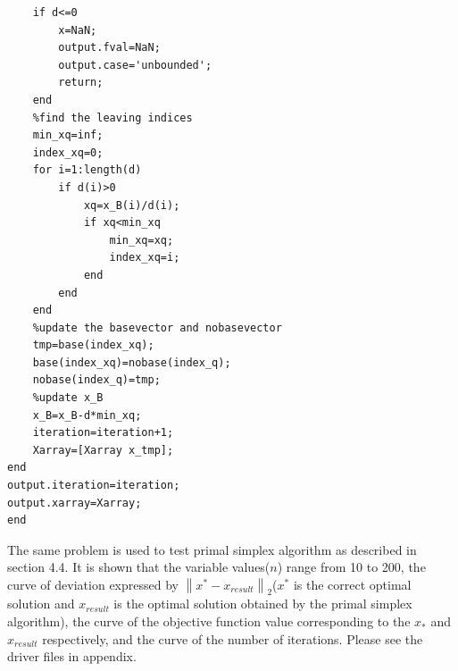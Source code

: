 {\begin{lstlisting}
    if d<=0
        x=NaN;
        output.fval=NaN;
        output.case='unbounded';
        return;
    end
    %find the leaving indices
    min_xq=inf;
    index_xq=0;
    for i=1:length(d)
        if d(i)>0
            xq=x_B(i)/d(i);
            if xq<min_xq
                min_xq=xq;
                index_xq=i;
            end
        end
    end
    %update the basevector and nobasevector
    tmp=base(index_xq);
    base(index_xq)=nobase(index_q);
    nobase(index_q)=tmp;
    %update x_B
    x_B=x_B-d*min_xq;
    iteration=iteration+1;
    Xarray=[Xarray x_tmp];
end
output.iteration=iteration;
output.xarray=Xarray;
end
\end{lstlisting}}
The same problem is used to test primal simplex algorithm as described in section 4.4. It is shown that the variable values($n$) range from 10 to 200, the curve of deviation expressed by $\left\|x^*-x_{result}\right\|_2$($x^*$ is the correct optimal solution and $x_{result}$ is the optimal solution obtained by the primal simplex algorithm), the curve of the objective function value corresponding to the $x_{*}$ and $x_{result}$ respectively, and the curve of the number of iterations. Please see the driver files in appendix.

